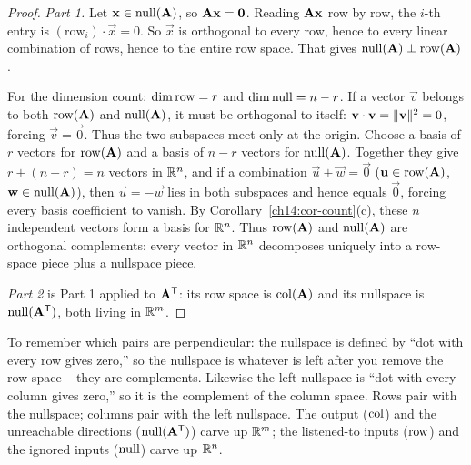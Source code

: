 \begin{proof}
\emph{Part 1.} Let $\mathbf{x}\in\operatorname{null}(\mathbf{A})$, so $\mathbf{A}\mathbf{x}=\mathbf{0}$. Reading $\mathbf{A}\mathbf{x}$
row by row, the $i$-th entry is $(\text{row}_i)\cdot\vec{x}=0$. So $\vec{x}$ is orthogonal to every
row, hence to every linear combination of rows, hence to the entire row space. That gives
$\operatorname{null}(\mathbf{A})\perp\operatorname{row}(\mathbf{A})$.

For the dimension count: $\operatorname{dim}\operatorname{row}=r$ and $\operatorname{dim}\operatorname{null}=n-r$. If a vector $\vec{v}$ belongs to
both $\operatorname{row}(\mathbf{A})$ and $\operatorname{null}(\mathbf{A})$, it must be orthogonal to itself:
$\mathbf{v}\cdot\mathbf{v}=\lVert\mathbf{v}\rVert^2=0$, forcing $\vec{v}=\vec{0}$. Thus the two subspaces meet only
at the origin. Choose a basis of $r$ vectors for $\operatorname{row}(\mathbf{A})$ and a basis of $n-r$ vectors for
$\operatorname{null}(\mathbf{A})$. Together they give $r+(n-r)=n$ vectors in $\mathbb{R}^n$, and if a combination
$\vec{u}+\vec{w}=\vec{0}$ ($\mathbf{u}\in\operatorname{row}(\mathbf{A})$, $\mathbf{w}\in\operatorname{null}(\mathbf{A})$), then
$\vec{u}=-\vec{w}$ lies in both subspaces and hence equals $\vec{0}$, forcing every basis
coefficient to vanish. By Corollary~\ref{ch14:cor-count}(c), these $n$ independent vectors form a
basis for $\mathbb{R}^n$. Thus $\operatorname{row}(\mathbf{A})$ and $\operatorname{null}(\mathbf{A})$ are orthogonal complements: every
vector in $\mathbb{R}^n$ decomposes uniquely into a row-space piece plus a nullspace piece.

\emph{Part 2} is Part 1 applied to $\mathbf{A}^{\mathsf{T}}$: its row space is $\operatorname{col}(\mathbf{A})$ and its nullspace
is $\operatorname{null}(\mathbf{A}^{\mathsf{T}})$, both living in $\mathbb{R}^m$.
\end{proof}

\begin{intuitionbox}
To remember which pairs are perpendicular: the nullspace is defined by
``dot with every row gives zero,'' so the nullspace is whatever is left after you remove the row
space -- they are complements. Likewise the left nullspace is ``dot with every column gives zero,''
so it is the complement of the column space. Rows pair with the nullspace; columns pair with the
left nullspace. The output ($\operatorname{col}$) and the unreachable directions ($\operatorname{null}(\mathbf{A}^{\mathsf{T}})$) carve up
$\mathbb{R}^m$; the listened-to inputs ($\operatorname{row}$) and the ignored inputs ($\operatorname{null}$) carve up $\mathbb{R}^n$.
\end{intuitionbox}

